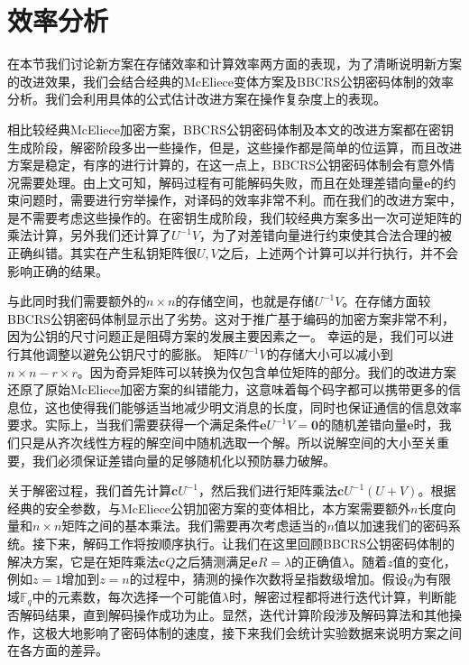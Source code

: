 \section{效率分析}
在本节我们讨论新方案在存储效率和计算效率两方面的表现，为了清晰说明新方案的改进效果，我们会结合经典的McEliece变体方案及BBCRS公钥密码体制的效率分析。我们会利用具体的公式估计改进方案在操作复杂度上的表现。

相比较经典McEliece加密方案，BBCRS公钥密码体制及本文的改进方案都在密钥生成阶段，解密阶段多出一些操作，但是，这些操作都是简单的位运算，而且改进方案是稳定，有序的进行计算的，在这一点上，BBCRS公钥密码体制会有意外情况需要处理。由上文可知，解码过程有可能解码失败，而且在处理差错向量$\mathbf{e}$的约束问题时，需要进行穷举操作，对译码的效率非常不利。而在我们的改进方案中，是不需要考虑这些操作的。在密钥生成阶段，我们较经典方案多出一次可逆矩阵的乘法计算，另外我们还计算了$U^{-1}V$，为了对差错向量进行约束使其合法合理的被正确纠错。其实在产生私钥矩阵很$U,V$之后，上述两个计算可以并行执行，并不会影响正确的结果。

与此同时我们需要额外的$n \times n$的存储空间，也就是存储$U^{-1}V$。在存储方面较BBCRS公钥密码体制显示出了劣势。这对于推广基于编码的加密方案非常不利，因为公钥的尺寸问题正是阻碍方案的发展主要因素之一。 幸运的是，我们可以进行其他调整以避免公钥尺寸的膨胀。 矩阵$U^{-1}V$的存储大小可以减小到$n \times n - r \times r$。因为奇异矩阵可以转换为仅包含单位矩阵的部分。我们的改进方案还原了原始McEliece加密方案的纠错能力，这意味着每个码字都可以携带更多的信息位，这也使得我们能够适当地减少明文消息的长度，同时也保证通信的信息效率要求。实际上，当我们需要获得一个满足条件$\mathbf{e}U^{-1}V = \mathbf{0}$的随机差错向量$\mathbf{e}$时，我们只是从齐次线性方程的解空间中随机选取一个解。所以说解空间的大小至关重要，我们必须保证差错向量的足够随机化以预防暴力破解。

关于解密过程，我们首先计算$\mathbf{c}U^{-1}$，然后我们进行矩阵乘法$\mathbf{c}U^{-1}(U + V)$。根据经典的安全参数，与McEliece公钥加密方案的变体相比，本方案需要额外$n$长度向量和$n \times n$矩阵之间的基本乘法。我们需要再次考虑适当的$n$值以加速我们的密码系统。接下来，解码工作将按顺序执行。让我们在这里回顾BBCRS公钥密码体制的解决方案，它是在矩阵乘法$\mathbf{c}Q$之后猜测满足$\mathbf{e}R = \lambda$的正确值$\lambda$。随着$z$值的变化，例如$z = 1$增加到$z = n$的过程中，猜测的操作次数将呈指数级增加。假设$q$为有限域$\mathbb{F}_q$中的元素数，每次选择一个可能值$\lambda$时，解密过程都将进行迭代计算，判断能否解码结果，直到解码操作成功为止。显然，迭代计算阶段涉及解码算法和其他操作，这极大地影响了密码体制的速度，接下来我们会统计实验数据来说明方案之间在各方面的差异。

